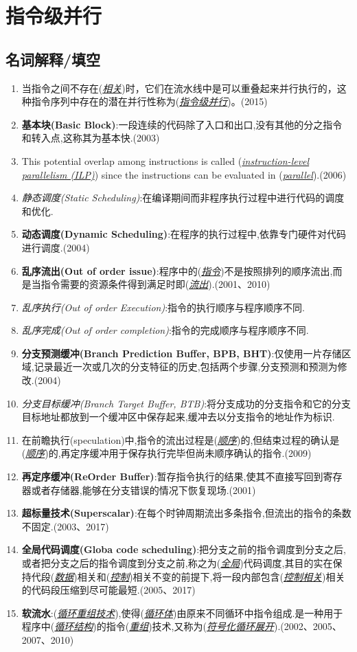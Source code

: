 \documentclass[a4paper]{ctexart}
\newcommand{\blank}[1]{(\emph{\underline{#1}})}
\begin{document}
\newpage
\section{指令级并行}
\subsection{名词解释/填空}
\begin{enumerate}
  \item 当指令之间不存在\blank{相关}时，它们在流水线中是可以重叠起来并行执行的，这种指令序列中存在的潜在并行性称为\blank{指令级并行}。(2015)
  \item \textbf{基本块(Basic Block)}:一段连续的代码除了入口和出口,没有其他的分之指令和转入点,这称其为基本快.(2003)
  \item This potential overlap among instructions is called (\emph{\underline{instruction-level parallelism (ILP)}}) since the instructions can be evaluated in (\emph{\underline{parallel}}).(2006)
  \item \emph{静态调度(Static Scheduling)}:在编译期间而非程序执行过程中进行代码的调度和优化.
  \item \textbf{动态调度(Dynamic Scheduling)}:在程序的执行过程中,依靠专门硬件对代码进行调度.(2004)
  \item \textbf{乱序流出(Out of order issue)}:程序中的\blank{指令}不是按照排列的顺序流出,而是当指令需要的资源条件得到满足时即\blank{流出}.(2001、2010)
  \item \emph{乱序执行(Out of order Execution)}:指令的执行顺序与程序顺序不同.
  \item \emph{乱序完成(Out of order completion)}:指令的完成顺序与程序顺序不同.
  \item \textbf{分支预测缓冲(Branch Prediction Buffer, BPB, BHT)}:仅使用一片存储区域,记录最近一次或几次的分支特征的历史,包括两个步骤,分支预测和预测为修改.(2004)
  \item \emph{分支目标缓冲(Branch Target Buffer, BTB)}:将分支成功的分支指令和它的分支目标地址都放到一个缓冲区中保存起来,缓冲去以分支指令的地址作为标识.
  \item 在前瞻执行(speculation)中,指令的流出过程是\blank{顺序}的,但结束过程的确认是\blank{顺序}的,再定序缓冲用于保存执行完毕但尚未顺序确认的指令.(2009)
  \item \textbf{再定序缓冲(ReOrder Buffer)}:暂存指令执行的结果,使其不直接写回到寄存器或者存储器,能够在分支错误的情况下恢复现场.(2001)
  \item \textbf{超标量技术(Superscalar)}:在每个时钟周期流出多条指令,但流出的指令的条数不固定.(2003、2017)
  \item \textbf{全局代码调度(Globa code scheduling)}:把分支之前的指令调度到分支之后,或者把分支之后的指令调度到分支之前,称之为(\emph{\underline{全局}})代码调度,其目的实在保持代段\blank{数据}相关和\blank{控制}相关不变的前提下,将一段内部包含\blank{控制相关}相关的代码段压缩到尽可能最短.(2005、2017)
  \item \textbf{软流水}:\blank{循环重组技术},使得\blank{循环体}由原来不同循环中指令组成.是一种用于程序中\blank{循环结构}的指令\blank{重组}技术,又称为\blank{符号化循环展开}.(2002、2005、2007、2010)
\end{enumerate}
\end{document}
